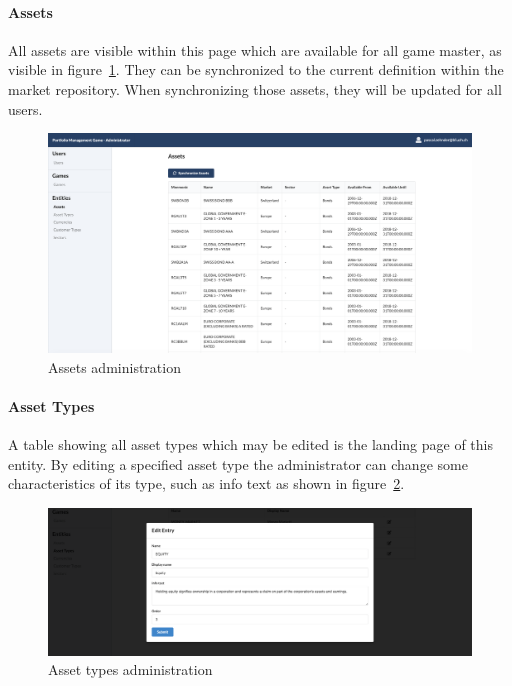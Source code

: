 \paragraph{Assets}
All assets are visible within this page which are available for all game master, as visible in figure~\ref{fig:assets}. They can be synchronized to the current definition within the market repository. When synchronizing those assets, they will be updated for all users. %
\begin{figure}[h!]
  \centering
  \includegraphics[scale=0.2]{img/application-overview/administrator/entities_assets.png}
  \caption{Assets administration}
  \label{fig:assets}
\end{figure}


\paragraph{Asset Types}
A table showing all asset types which may be edited is the landing page of this entity. By editing a specified asset type the administrator can change some characteristics of its type, such as info text as shown in figure~\ref{fig:asset_types}.
\begin{figure}[h!]
  \centering
  \includegraphics[scale=0.2]{img/application-overview/administrator/entities_asset_types.png}
  \caption{Asset types administration}
  \label{fig:asset_types}
\end{figure}

